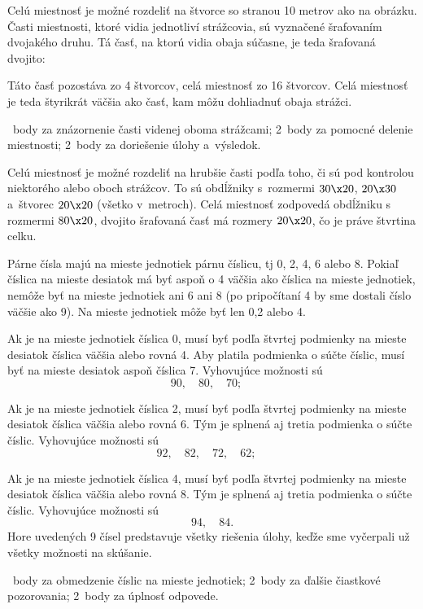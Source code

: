 {%
Celú miestnosť je možné rozdeliť na štvorce so stranou 10 metrov ako na obrázku.
Časti miestnosti, ktoré vidia jednotliví strážcovia, sú vyznačené šrafovaním dvojakého druhu.
Tá časť, na ktorú vidia obaja súčasne, je teda šrafovaná dvojito:
%

Táto časť pozostáva zo 4 štvorcov, celá miestnosť zo 16 štvorcov. Celá miestnosť je teda štyrikrát väčšia ako časť, kam môžu dohliadnuť obaja strážci.

~body za znázornenie časti videnej oboma strážcami;
2~body za pomocné delenie miestnosti;
2~body za doriešenie úlohy a~výsledok.

\poznamka
Celú miestnosť je možné rozdeliť na hrubšie časti podľa toho, či sú pod kontrolou niektorého alebo oboch strážcov.
To sú obdĺžniky s~rozmermi $30\x20$, $20\x30$ a~štvorec $20\x20$ (všetko v~metroch).
Celá miestnosť zodpovedá obdĺžniku s rozmermi $80\x20$, dvojito šrafovaná časť má rozmery $20\x20$, čo je práve štvrtina celku.
\endhodnotenie
}

{%
Párne čísla majú na mieste jednotiek párnu číslicu, tj 0, 2, 4, 6 alebo 8. Pokiaľ číslica na mieste desiatok má byť aspoň o 4 väčšia ako číslica na mieste jednotiek, nemôže byť na mieste jednotiek ani 6 ani 8 (po pripočítaní 4 by sme dostali číslo väčšie ako 9). Na mieste jednotiek môže byť len 0,2 alebo 4.

Ak je na mieste jednotiek číslica 0, musí byť podľa štvrtej podmienky na mieste desiatok číslica väčšia alebo rovná 4. Aby platila podmienka o súčte číslic, musí byť na mieste desiatok aspoň číslica 7. Vyhovujúce možnosti sú
$$
90,\quad 80,\quad 70;\quad
$$

Ak je na mieste jednotiek číslica 2, musí byť podľa štvrtej podmienky na mieste desiatok číslica väčšia alebo rovná 6. Tým je splnená aj tretia podmienka o súčte číslic. Vyhovujúce možnosti sú
$$
92,\quad 82,\quad 72,\quad 62;\quad
$$

Ak je na mieste jednotiek číslica 4, musí byť podľa štvrtej podmienky na mieste desiatok číslica väčšia alebo rovná 8. Tým je splnená aj tretia podmienka o súčte číslic. Vyhovujúce možnosti sú
$$
94,\quad 84.
$$
Hore uvedených 9 čísel predstavuje všetky riešenia úlohy, keďže sme vyčerpali už všetky možnosti na skúšanie.

~body za obmedzenie číslic na mieste jednotiek;
2~body za ďalšie čiastkové pozorovania;
2~body za úplnosť odpovede.
\endhodnotenie
}

